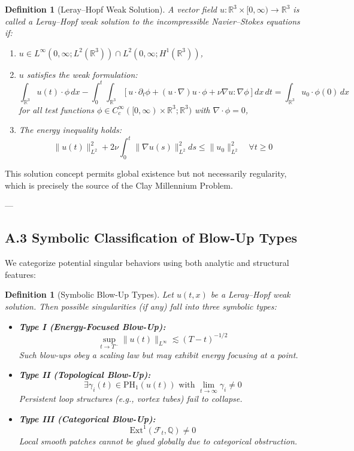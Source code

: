 \documentclass[11pt]{article}
\newtheorem{definition}[theorem]{Definition}
\begin{document}
\begin{definition}[Leray–Hopf Weak Solution]
A vector field \( u : \mathbb{R}^3 \times [0, \infty) \to \mathbb{R}^3 \) is called a Leray–Hopf weak solution to the incompressible Navier–Stokes equations if:

\begin{enumerate}
  \item \( u \in L^\infty(0, \infty; L^2(\mathbb{R}^3)) \cap L^2(0, \infty; H^1(\mathbb{R}^3)) \),
  \item \( u \) satisfies the weak formulation:
  \[
  \int_{\mathbb{R}^3} u(t) \cdot \phi \, dx
  - \int_0^t \int_{\mathbb{R}^3} \left[ u \cdot \partial_t \phi
  + (u \cdot \nabla)u \cdot \phi
  + \nu \nabla u : \nabla \phi \right] dx\,dt
  = \int_{\mathbb{R}^3} u_0 \cdot \phi(0) \, dx
  \]
  for all test functions \( \phi \in C_c^\infty([0,\infty) \times \mathbb{R}^3; \mathbb{R}^3) \) with \( \nabla \cdot \phi = 0 \),
  \item The energy inequality holds:
  \[
  \|u(t)\|_{L^2}^2 + 2\nu \int_0^t \|\nabla u(s)\|_{L^2}^2 ds
  \le \|u_0\|_{L^2}^2
  \quad \forall t \ge 0
  \]
\end{enumerate}
\end{definition}

This solution concept permits global existence but not necessarily regularity,  
which is precisely the source of the Clay Millennium Problem.

---

\subsection*{A.3 Symbolic Classification of Blow-Up Types}

We categorize potential singular behaviors using both analytic and structural features:

\begin{definition}[Symbolic Blow-Up Types]
Let \( u(t,x) \) be a Leray–Hopf weak solution. Then possible singularities (if any) fall into three symbolic types:

\begin{itemize}
  \item \textbf{Type I (Energy-Focused Blow-Up):}
  \[
  \sup_{t \to T^-} \|u(t)\|_{L^\infty} \lesssim (T - t)^{-1/2}
  \]
  Such blow-ups obey a scaling law but may exhibit energy focusing at a point.

  \item \textbf{Type II (Topological Blow-Up):}
  \[
  \exists \gamma_i(t) \in \mathrm{PH}_1(u(t)) \text{ with } \lim_{t \to \infty} \gamma_i \ne 0
  \]
  Persistent loop structures (e.g., vortex tubes) fail to collapse.

  \item \textbf{Type III (Categorical Blow-Up):}
  \[
  \mathrm{Ext}^1(\mathcal{F}_t, \mathbb{Q}) \ne 0
  \]
  Local smooth patches cannot be glued globally due to categorical obstruction.
\end{itemize}
\end{definition}
\end{document}

